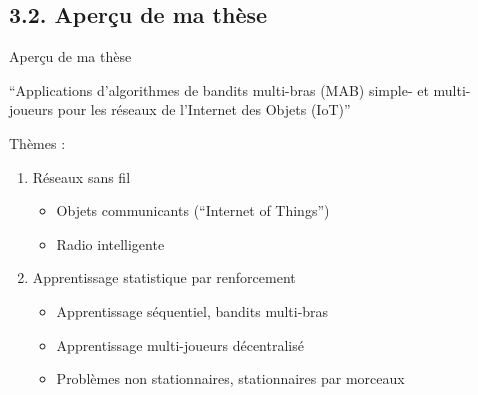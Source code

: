 \documentclass[11pt,english,ignorenonframetext,]{beamer}
\begin{document}





\subsection{\hfill{}3.2. Aperçu de ma thèse\hfill{}}


\begin{frame}{Aperçu de ma thèse}

\begin{center}
  ``Applications d'algorithmes de bandits multi-bras (MAB) simple-
    et multi-joueurs pour les réseaux de l'Internet des Objets (IoT)''
\end{center}

Thèmes :

\begin{enumerate}
  \item
  Réseaux sans fil
  \begin{itemize}
    \item
    Objets communicants (``Internet of Things'')
    \item
    Radio intelligente
  \end{itemize}
  \item
  Apprentissage statistique par renforcement
  \begin{itemize}
    \item
    Apprentissage séquentiel, bandits multi-bras
    \item
    Apprentissage multi-joueurs décentralisé
    \item
    \alert{Problèmes non stationnaires, stationnaires par morceaux}
  \end{itemize}
\end{enumerate}

\end{frame}
\end{document}
